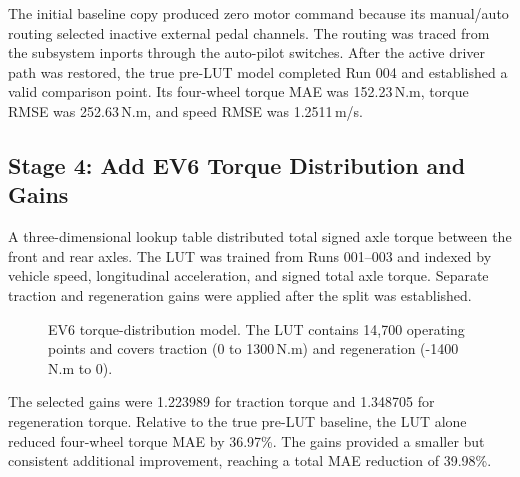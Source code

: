 \documentclass[11pt,letterpaper]{article}
\newcommand{\SI}[2]{#1\,#2}
\begin{document}
The initial baseline copy produced zero motor command because its manual/auto
routing selected inactive external pedal channels. The routing was traced from
the subsystem inports through the auto-pilot switches. After the active driver
path was restored, the true pre-LUT model completed Run 004 and established a
valid comparison point. Its four-wheel torque MAE was \SI{152.23}{N.m}, torque
RMSE was \SI{252.63}{N.m}, and speed RMSE was \SI{1.2511}{m/s}.

\subsection{Stage 4: Add EV6 Torque Distribution and Gains}

A three-dimensional lookup table distributed total signed axle torque between
the front and rear axles. The LUT was trained from Runs 001--003 and indexed by
vehicle speed, longitudinal acceleration, and signed total axle torque. Separate
traction and regeneration gains were applied after the split was established.

\begin{figure}[H]
\centering
{}
\caption{EV6 torque-distribution model. The LUT contains 14,700 operating points and covers traction (0 to \SI{1300}{N.m}) and regeneration (\SI{-1400}{N.m} to 0).}
\end{figure}

The selected gains were 1.223989 for traction torque and 1.348705 for
regeneration torque. Relative to the true pre-LUT baseline, the LUT alone
reduced four-wheel torque MAE by 36.97\%. The gains provided a smaller but
consistent additional improvement, reaching a total MAE reduction of 39.98\%.
\end{document}
